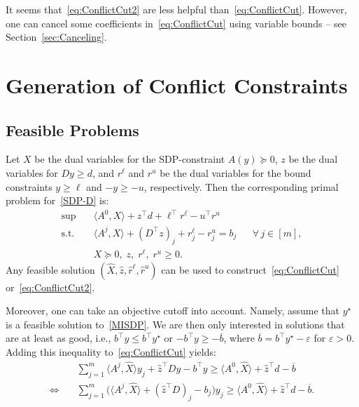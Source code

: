 \documentclass[10pt, a4paper]{article}
\newcommand{\skal}[2]{\langle{#1},{#2}\rangle}
\newcommand{\T}{^{\top}}
\begin{document}
It seems that~\eqref{eq:ConflictCut2} are less helpful
than~\eqref{eq:ConflictCut}. However, one can cancel some coefficients
in~\eqref{eq:ConflictCut} using variable bounds -- see
Section~\ref{sec:Canceling}.


\section{Generation of Conflict Constraints}

\subsection{Feasible Problems}

Let $X$ be the dual variables for the SDP-constraint $A(y) \succeq 0$, $z$
be the dual variables for $Dy \geq d$, and $r^\ell$ and $r^u$ be the dual
variables for the bound constraints $y \geq \ell$ and $-y \geq -u$,
respectively. Then the corresponding primal problem for~\eqref{SDP-D} is:
\begin{equation}\label{SDP-P}
  \begin{aligned}
     \sup \quad & \skal{A^0}{X} + z\T d + \ell\T r^\ell - u\T r^u\\
     \text{s.t.} \quad & \skal{A^j}{X} + (D\T z)_j + r^\ell_j - r^u_j = b_j && \forall \, j \in [m],\\
     & X \succeq 0,\; z, \; r^\ell,\; r^u \geq 0.
  \end{aligned}
\end{equation}
Any feasible solution $(\hat{X}, \hat{z}, \hat{r}^\ell, \hat{r}^u)$ can be
used to construct~\eqref{eq:ConflictCut} or~\eqref{eq:ConflictCut2}.

Moreover, one can take an objective cutoff into account. Namely, assume
that $y^\star$ is a feasible solution to~\eqref{MISDP}. We are then only
interested in solutions that are at least as good, i.e.,
$b\T y \leq b\T y^\star$ or $- b\T y \geq - \overline{b}$, where
$\overline{b} = b\T y^\star - \varepsilon$ for $\varepsilon > 0$. Adding
this inequality to~\eqref{eq:ConflictCut} yields:
\begin{align*}
  & \sum_{j=1}^m \skal{A^j}{\hat{X}} y_j + \hat{z}\T D y - b\T y \geq
    \skal{A^0}{\hat{X}} + \hat{z}\T d - \overline{b}\\
  \Leftrightarrow\quad
  & \sum_{j=1}^m \big(\skal{A^j}{\hat{X}} + (\hat{z}\T D)_j - b_j\big) y_j \geq
    \skal{A^0}{\hat{X}} + \hat{z}\T d - \overline{b}.
\end{align*}
\end{document}
